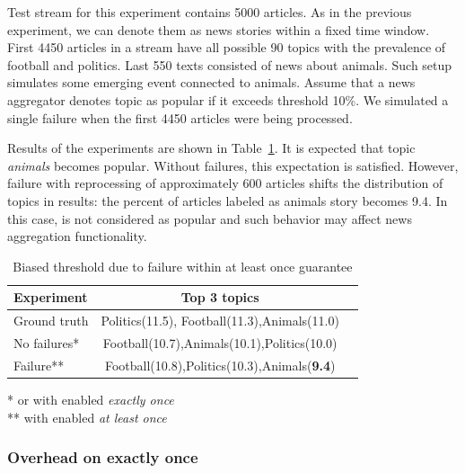 
Test stream for this experiment contains 5000 articles. As in the previous experiment, we can denote them as news stories within a fixed time window. First 4450 articles in a stream have all possible 90 topics with the prevalence of football and politics. Last 550 texts consisted of news about animals. Such setup simulates some emerging event connected to animals. Assume that a news aggregator denotes topic as popular if it exceeds threshold 10\%. We simulated a single failure when the first 4450 articles were being processed.

Results of the experiments are shown in Table~\ref{biased_threshold}. It is expected that topic {\em animals} becomes popular. Without failures, this expectation is satisfied. However, failure with reprocessing of approximately 600 articles shifts the distribution of topics in results: the percent of articles labeled as animals story becomes 9.4. In this case, is not considered as popular and such behavior may affect news aggregation functionality.

\begin{table}[htbp]
\caption{Biased threshold due to failure within at least once guarantee}
\begin{threeparttable}
\begin{tabular}{lcl}
Experiment    & Top 3 topics    \\
\hline
Ground truth   &   Politics(11.5), Football(11.3),Animals(11.0)    \\
No failures*   &   Football(10.7),Animals(10.1),Politics(10.0)    \\
Failure**   &   Football(10.8),Politics(10.3),Animals({\bf 9.4})    \\
\end{tabular}
* or with enabled {\em exactly once} \\
** with enabled {\em at least once}
\end{threeparttable}
\label{biased_threshold}
\end{table}

\subsubsection{Overhead on exactly once}

